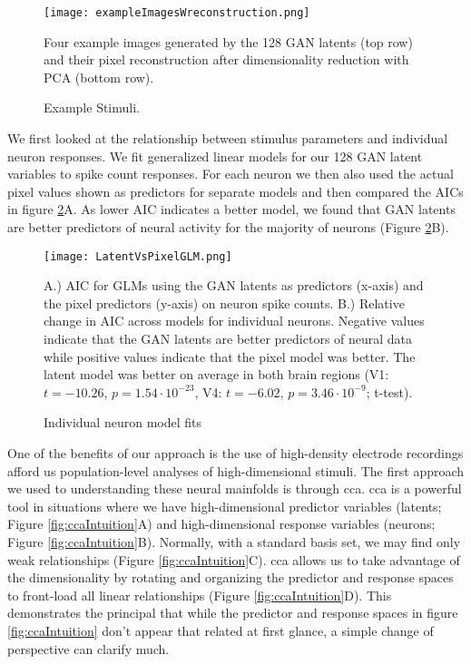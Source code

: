 \begin{figure}
	\centering
	\texttt{[image: exampleImagesWreconstruction.png]}
	\caption{Example Stimuli.}{Four example images generated by the 128 GAN latents (top row) and their pixel reconstruction after dimensionality reduction with PCA (bottom row).}
	\label{fig:exampleReconstructions}
\end{figure}

We first looked at the relationship between stimulus parameters and individual neuron responses. We fit generalized linear models for our 128 GAN latent variables to spike count responses. For each neuron we then also used the actual pixel values shown as predictors for separate models and then compared the AICs in figure \ref{fig:modelAICs}A. As lower AIC indicates a better model, we found that GAN latents are better predictors of neural activity for the majority of neurons (Figure \ref{fig:modelAICs}B).

\begin{figure}
	\centering
	\texttt{[image: LatentVsPixelGLM.png]}
	\caption{Individual neuron model fits}{A.) AIC for GLMs using the GAN latents as predictors (x-axis) and the pixel predictors (y-axis) on neuron spike counts. B.) Relative change in AIC across models for individual neurons. Negative values indicate that the GAN latents are better predictors of neural data while positive values indicate that the pixel model was better. The latent model was better on average in both brain regions (V1: $t=-10.26$, $p=1.54 \cdot 10^{-23}$, V4: $t=-6.02$, $p=3.46\cdot 10^{-9}$; t-test).}
	\label{fig:modelAICs}
\end{figure}

One of the benefits of our approach is the use of high-density electrode recordings afford us population-level analyses of high-dimensional stimuli. The first approach we used to understanding these neural mainfolds is through \gls{cca}. \gls{cca} is a powerful tool in situations where we have high-dimensional predictor variables (latents; Figure \ref{fig:ccaIntuition}A) and high-dimensional response variables (neurons; Figure \ref{fig:ccaIntuition}B). Normally, with a standard basis set, we may find only weak relationships (Figure \ref{fig:ccaIntuition}C). \gls{cca} allows us to take advantage of the dimensionality by rotating and organizing the predictor and response spaces to front-load all linear relationships (Figure \ref{fig:ccaIntuition}D). This demonstrates the principal that while the predictor and response spaces in figure \ref{fig:ccaIntuition} don't appear that related at first glance, a simple change of perspective can clarify much.


